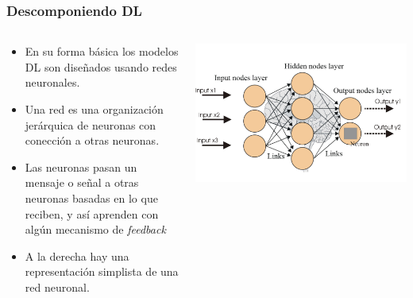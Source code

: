 \documentclass[8pt,spanish]{beamer}
\begin{document}
\begin{frame}[fragile]
\frametitle{Descomponiendo DL}
\begin{columns}
\begin{column}{0.4\textwidth}
\begin{itemize}\small
    \item En su forma b\'asica los modelos DL son dise\~nados usando redes neuronales.
    \item Una red es una organizaci\'on jer\'arquica de neuronas con conecci\'on a otras neuronas.
    \item Las neuronas pasan un mensaje o se\~nal a otras neuronas basadas en lo que reciben, y as\'i aprenden con alg\'un mecanismo de \textit{feedback}
    \item A la derecha hay una representaci\'on simplista de una red neuronal.
\end{itemize}
\end{column}
\begin{column}{0.6\textwidth}  %
    \begin{center}
     \includegraphics[width=1.0\textwidth]{simplenn.jpg}
     \end{center}
\end{column}
\end{columns}
\end{frame}


\end{document}
